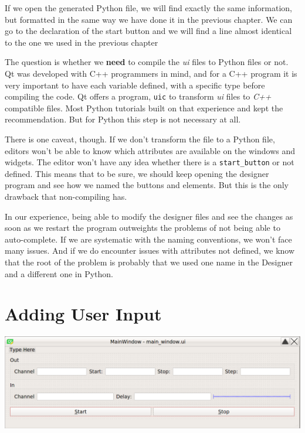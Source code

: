 If we open the generated Python file, we will find exactly the same information, but formatted in the same way we have done it in the previous chapter. We can go to the declaration of the start button and we will find a line almost identical to the one we used in the previous chapter


The question is whether we \textbf{need} to compile the \emph{ui} files to Python files or not. Qt was developed with C++ programmers in mind, and for a C++ program it is very important to have each variable defined, with a specific type before compiling the code. Qt offers a program, \texttt{uic} to transform \emph{ui} files to \emph{C++} compatible files. Most Python tutorials built on that experience and kept the recommendation. But for Python this step is not necessary at all.

There is one caveat, though. If we don't transform the file to a Python file, editors won't be able to know which attributes are available on the windows and widgets. The editor won't have any idea whether there is a \texttt{start\_button} or not defined. This means that to be sure, we should keep opening the designer program and see how we named the buttons and elements. But this is the only drawback that non-compiling has.

In our experience, being able to modify the designer files and see the changes as soon as we restart the program outweights the problems of not being able to auto-complete. If we are systematic with the naming conventions, we won't face many issues. And if we do encounter issues with attributes not defined, we know that the root of the problem is probably that we used one name in the Designer and a different one in Python.

\section{Adding User Input}\label{sec:adding-user-input}
\begin{center}
    \includegraphics[width=.5\textwidth]{images/Chapter_09/08_final_window_example.png}
\end{center}


